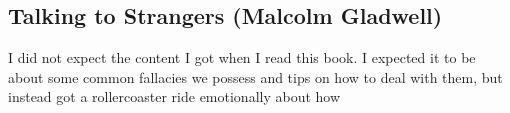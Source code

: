 \subsection{Talking to Strangers (Malcolm Gladwell)}

I did not expect the content I got when I read this book. I expected it to be about some common fallacies we possess and tips on how to deal with them, but instead got a rollercoaster ride emotionally about how 